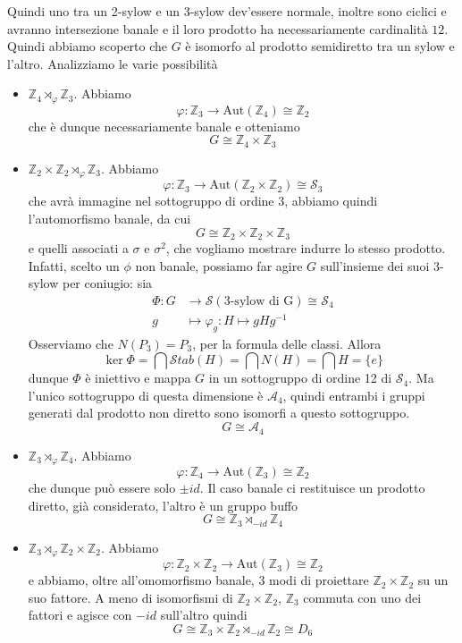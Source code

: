 \documentclass[a4paper]{article}
\theoremstyle{remark}
\theoremstyle{definition}
\newcommand{\Aut}[1]{\mathrm{Aut}\left( #1 \right)}
\newcommand{\Stab}[1]{\mathcal{S}tab\left( #1 \right)}
\newcommand{\Z}{\mathbb{Z}}
\newcommand{\fun}[5]{\begin{align*}
	#1 \colon #2 &\to #3 \\
	#4 &\mapsto #5
	\end{align*}}
\begin{document}
\begin{multicols}{2}
Quindi uno tra un 2-sylow e un 3-sylow dev'essere normale, inoltre sono ciclici e avranno intersezione banale e il loro prodotto ha necessariamente cardinalità $ 12 $. Quindi abbiamo scoperto che $ G $ è isomorfo al prodotto semidiretto tra un sylow e l'altro. Analizziamo le varie possibilità

\begin{itemize}
	\item $ \Z_4 \rtimes_\varphi \Z_3 $. Abbiamo
	\[ \varphi : \Z_3 \to \Aut{\Z_4} \cong \Z_2 \]
	che è dunque necessariamente banale e otteniamo
	\[ \boxed{G \cong \Z_4 \times \Z_3} \]
	\item $ \Z_2 \times \Z_2 \rtimes_\varphi \Z_3 $. Abbiamo
	\[ \varphi : \Z_3 \to \Aut{\Z_2\times\Z_2} \cong \mathcal{S}_3 \]
	che avrà immagine nel sottogruppo di ordine $ 3 $, abbiamo quindi l'automorfismo banale, da cui
	\[  \boxed{G \cong \Z_2 \times \Z_2 \times \Z_3} \]
	e quelli associati a $ \sigma $ e $ \sigma^2 $, che vogliamo mostrare indurre lo stesso prodotto. Infatti, scelto un $ \phi $ non banale, possiamo far agire $ G $ sull'insieme dei suoi 3-sylow per coniugio: sia \fun{\Phi}{G}{\mathcal{S}({\text{3-sylow di G}})\cong \mathcal{S}_4}{g}{\varphi_g : H \mapsto gHg^{-1}}
	Osserviamo che $ N(P_3) = P_3 $, per la formula delle classi. Allora $$  \ker\Phi = \bigcap \Stab{H} = \bigcap N(H) = \bigcap H = \{ e \}  $$ dunque $ \Phi $ è iniettivo e mappa $ G $ in un sottogruppo di ordine 12 di $ \mathcal{S}_4 $. Ma l'unico sottogruppo di questa dimensione è $ \mathcal{A}_4 $, quindi entrambi i gruppi generati dal prodotto non diretto sono isomorfi a questo sottogruppo.
	\[ \boxed{G \cong \mathcal{A}_4} \]
	\item $ \Z_3 \rtimes_\varphi \Z_4 $. Abbiamo
	\[ \varphi : \Z_4 \to \Aut{\Z_3} \cong \Z_2 \]
	che dunque può essere solo $ \pm id $. Il caso banale ci restituisce un prodotto diretto, già considerato, l'altro è un gruppo buffo
	\[ \boxed{G \cong \Z_3 \rtimes_{-id} \Z_4} \]
	\item $ \Z_3 \rtimes_\varphi \Z_2 \times \Z_2  $. Abbiamo
	\[ \varphi : \Z_2 \times \Z_2  \to \Aut{\Z_3} \cong \Z_2 \]
	e abbiamo, oltre all'omomorfismo banale, 3 modi di proiettare $ \Z_2 \times \Z_2  $ su un suo fattore. A meno di isomorfismi di $ \Z_2 \times \Z_2  $, $ \Z_3 $ commuta con uno dei fattori e agisce con $ -id $ sull'altro quindi
	\[ \boxed{G \cong \Z_3\times \Z_2 \rtimes_{-id} \Z_2 \cong D_6} \]
\end{itemize}




\end{multicols}
\end{document}
